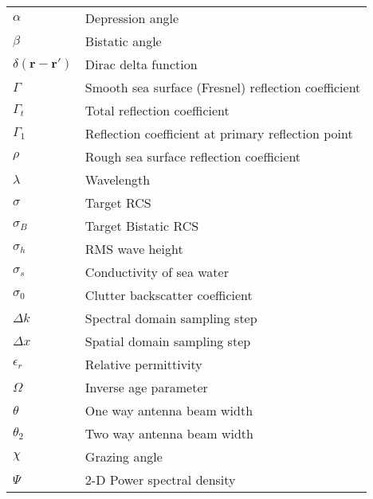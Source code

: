 \begin{supertabular}{ll}
\\
$\alpha$ & Depression angle \\
$\beta$ & Bistatic angle \\
$\delta\left(\mathbf{r}-\mathbf{r}' \right)$ & Dirac delta function \\
$\Gamma$ & Smooth sea surface (Fresnel) reflection coefficient \\
$\Gamma_t$ & Total reflection coefficient \\
$\Gamma_1$ & Reflection coefficient at primary reflection point\\
$\rho$ & Rough sea surface reflection coefficient \\
$\lambda$ & Wavelength \\
$\sigma$ & Target RCS\\
$\sigma_B$ & Target Bistatic RCS \\
$\sigma_h$ & RMS wave height \\
$\sigma_s$ & Conductivity of sea water \\
$\sigma_0$ & Clutter backscatter coefficient \\
$\Delta k$ & Spectral domain sampling step \\
$\Delta x$ & Spatial domain sampling step \\
$\epsilon_r$ & Relative permittivity \\
$\Omega$ & Inverse age parameter \\
$\theta$ & One way antenna beam width \\
$\theta_2$ & Two way antenna beam width \\
$\chi$ & Grazing angle \\
$\Psi $ & 2-D Power spectral density \\
\end{supertabular}